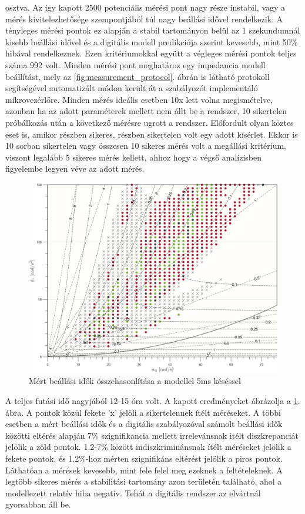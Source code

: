 osztva. Az így kapott 2500 potenciális mérési pont nagy része instabil, vagy a mérés kivitelezhetősége szempontjából 
túl nagy beállási idővel rendelkezik. A tényleges mérési pontok ez alapján a stabil tartományon belül az 1 szekundumnál 
kisebb beállási idővel és a digitális modell predikciója szerint kevesebb, mint 50\% hibával rendelkeznek. Ezen kritériumokkal 
együtt a végleges mérési pontok teljes száma 992 volt. Minden mérési pont meghatároz egy impedancia modell beállítást, mely 
az \ref{fig:measurement_protocol}. ábrán is látható protokoll segítségével automatizált módon került át a szabályozót 
implementáló mikrovezérlőre. Minden mérés ideális esetben 10x lett volna megismételve, azonban ha az adott paraméterek mellett 
nem állt be a rendszer, 10 sikertelen próbálkozás után a következő mérésre ugrott a rendszer. Előfordult olyan köztes eset is, 
amikor részben sikeres, részben sikertelen volt egy adott kísérlet. Ekkor is 10 sorban sikertelen vagy összesen 10 sikeres 
mérés volt a megállási kritérium, viszont legalább 5 sikeres mérés kellett, ahhoz hogy a végső analízisben figyelembe legyen 
véve az adott mérés.
\begin{figure}[H]
    \begin{center}
    \includegraphics[width=\textwidth]{images/experiment_comparison_0005.png}
    \caption{Mért beállási idők összehasonlítása a modellel 5ms késéssel}\label{fig:experiment_comparison_0005}
    \end{center}
\end{figure}
A teljes futási idő nagyjából 12-15 óra volt. A kapott eredményeket ábrázolja a \ref{fig:experiment_comparison_0005}. ábra.
A pontok közül fekete 'x' jelöli a sikertelennek ítélt méréseket. A többi esetben a mért beállási idők és a digitális 
szabályozóval számolt beállási idők közötti eltérés alapján 7\% szignifikancia mellett irrelevánsnak itélt diszkrepanciát 
jelölik a zöld pontok. 1.2-7\% között indiszkriminánsnak ítélt méréseket jelölik a fekete pontok, és 1.2\%-hoz mérten 
szignifikáns eltérést jelölik a piros pontok. Láthatóan a mérések kevesebb, mint fele felel meg ezeknek a feltételeknek. 
A legtöbb sikeres mérés a stabilitási tartomány azon területén található, ahol a modellezett relatív hiba negatív. Tehát 
a digitális rendszer az elvártnál gyorsabban áll be. 
